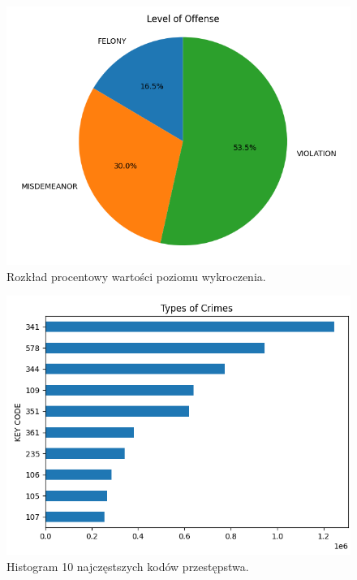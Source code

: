 \documentclass{classrep}
\begin{document}
{{{                \begin{figure}[!htbp]
                    \centering
                    \includegraphics[width=\textwidth]{img/5.1.3/wnioski/offenseLevel.png}
                    \caption{Rozkład procentowy wartości poziomu wykroczenia.}
                    \label{goal_1_results_offenseLevel}
                \end{figure}
                
                \begin{figure}[!htbp]
                    \centering
                    \includegraphics[width=\textwidth]{img/5.1.3/wnioski/typesOfCrimes.png}
                    \caption{Histogram 10 najczęstszych kodów przestępstwa.}
                    \label{goal_1_results_crimesTypes}
                \end{figure}
                \FloatBarrier

}}}
\end{document}
